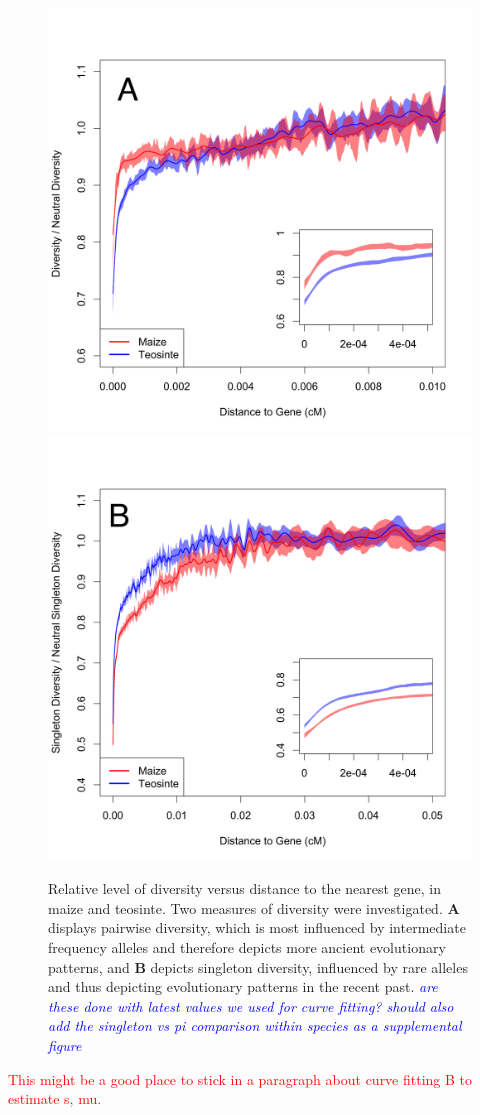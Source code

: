\documentclass{pnastwo}
\newcommand{\jri}[1]{\textcolor{blue}{\emph{#1}} }
\begin{document}
\begin{article}
\begin{figure}[b]
\centering
\includegraphics[width=.45\textwidth]{FigsAndFiles/distanceToGene_WithSignificance_Folded2_manuscript.png} \includegraphics[width=.45\textwidth]{FigsAndFiles/distanceToGene_WithSignificance_Singletons_manuscript.png}
\caption{Relative level of diversity versus distance to the nearest
  gene, in maize and teosinte. Two measures of diversity were
  investigated. \textbf{A} displays pairwise
  diversity, which is most influenced by intermediate frequency
  alleles and therefore depicts more ancient evolutionary patterns,
  and \textbf{B} depicts singleton diversity, influenced by rare
  alleles and thus depicting evolutionary patterns in the recent past. \jri{are these done with latest values we used for curve fitting? should also add the singleton vs pi comparison within species as a supplemental figure}}
\label{purify}
\end{figure}


\textcolor{red}{This might be a good place to stick in a paragraph
  about curve fitting B to estimate s, mu.}



\end{article}
\end{document}
